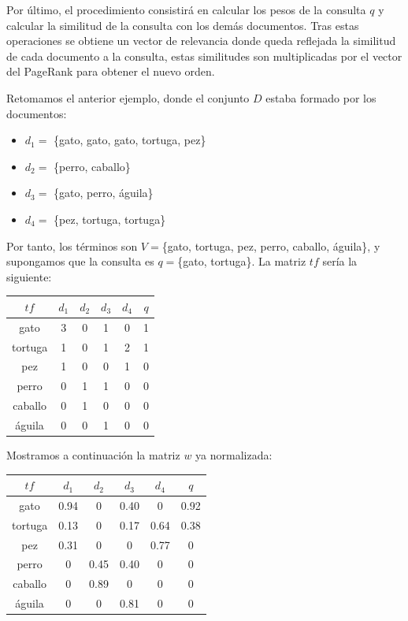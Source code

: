 \documentclass[size=a4, parskip=half, titlepage=false, toc=flat, toc=bib, 12pt]{scrartcl}
\theoremstyle{theorem-style}
\theoremstyle{definition-style}
\theoremstyle{remark-style}
\theoremstyle{example-style}
\theoremstyle{definition-style}
\theoremstyle{remark-style}
\begin{document}
Por último, el procedimiento consistirá en calcular los pesos de la consulta $q$ y calcular la similitud de la consulta con los demás documentos. Tras estas operaciones se obtiene un vector de relevancia donde queda reflejada la similitud de cada documento a la consulta, estas similitudes son multiplicadas por el vector del PageRank para obtener el nuevo orden.

Retomamos el anterior ejemplo, donde el conjunto $D$ estaba formado por los documentos:
\begin{itemize}
\item $d_1 = $ \{gato, gato, gato, tortuga, pez\}
\item $d_2 = $ \{perro, caballo\}
\item $d_3 = $ \{gato, perro, águila\}
\item $d_4 = $ \{pez, tortuga, tortuga\}
\end{itemize}
Por tanto, los términos son $V=$\{gato, tortuga, pez, perro, caballo, águila\}, y supongamos que la consulta es $q =$\{gato, tortuga\}.
La matriz $tf$ sería la siguiente:
\begin{table}[H]
\centering
\begin{tabular}{|c|c|c|c|c|c|}
\hline
$tf$    & $d_1$ & $d_2$ & $d_3$ & $d_4$ & $q$ \\ \hline
gato    & 3     & 0     & 1     & 0     & 1   \\ \hline
tortuga & 1     & 0     & 1     & 2     & 1   \\ \hline
pez     & 1     & 0     & 0     & 1     & 0   \\ \hline
perro   & 0     & 1     & 1     & 0     & 0   \\ \hline
caballo & 0     & 1     & 0     & 0     & 0   \\ \hline
águila  & 0     & 0     & 1     & 0     & 0   \\ \hline
\end{tabular}
\end{table}
Mostramos a continuación la matriz $w$ ya normalizada:
\begin{table}[H]
\centering
\begin{tabular}{|c|c|c|c|c|c|}
\hline
$tf$    & $d_1$ & $d_2$ & $d_3$ & $d_4$ & $q$  \\ \hline
gato    & 0.94  & 0     & 0.40  & 0     & 0.92 \\ \hline
tortuga & 0.13  & 0     & 0.17  & 0.64  & 0.38 \\ \hline
pez     & 0.31  & 0     & 0     & 0.77  & 0    \\ \hline
perro   & 0     & 0.45  & 0.40  & 0     & 0    \\ \hline
caballo & 0     & 0.89  & 0     & 0     & 0    \\ \hline
águila  & 0     & 0     & 0.81  & 0     & 0    \\ \hline
\end{tabular}
\end{table}
\end{document}
